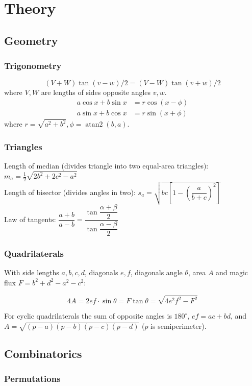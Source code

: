 
\chapter{Theory}

\section{Geometry}

\subsection{Trigonometry}
\[ (V+W)\tan(v-w)/2{}=(V-W)\tan(v+w)/2 \]
where $V, W$ are lengths of sides opposite angles $v, w$.
\begin{align*}
	a\cos x+b\sin x&=r\cos(x-\phi)\\
	a\sin x+b\cos x&=r\sin(x+\phi)
\end{align*}
where $r=\sqrt{a^2+b^2}, \phi=\operatorname{atan2}(b,a)$.

\subsection{Triangles}
Length of median (divides triangle into two equal-area triangles): $m_a=\tfrac{1}{2}\sqrt{2b^2+2c^2-a^2}$\\
Length of bisector (divides angles in two): $s_a=\sqrt{bc\left[1-\left(\dfrac{a}{b+c}\right)^2\right]}$\\
Law of tangents: $\dfrac{a+b}{a-b}=\dfrac{\tan\dfrac{\alpha+\beta}{2}}{\tan\dfrac{\alpha-\beta}{2}}$\\

\subsection{Quadrilaterals}
With side lengths $a,b,c,d$, diagonals $e, f$, diagonals angle $\theta$, area $A$ and
magic flux $F=b^2+d^2-a^2-c^2$:

\[ 4A = 2ef \cdot \sin\theta = F\tan\theta = \sqrt{4e^2f^2-F^2} \]

 For cyclic quadrilaterals the sum of opposite angles is $180^\circ$,
$ef = ac + bd$, and $A = \sqrt{(p-a)(p-b)(p-c)(p-d)}$ ($p$ is semiperimeter).

\section{Combinatorics}

\subsection{Permutations}

